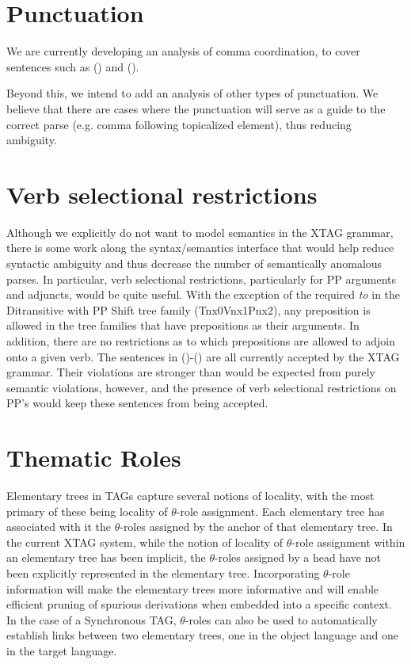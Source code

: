 \section{Punctuation}

We are currently developing an analysis of comma coordination, to
cover sentences such as () and ().


Beyond this, we intend to add an analysis of other types of punctuation. We
believe that there are cases where the punctuation will serve as a guide to the
correct parse (e.g. comma following topicalized element), thus reducing
ambiguity.


\section{Verb selectional restrictions}

Although we explicitly do not want to model semantics in the XTAG grammar,
there is some work along the syntax/semantics interface that would help reduce
syntactic ambiguity and thus decrease the number of semantically anomalous
parses.  In particular, verb selectional restrictions, particularly for PP
arguments and adjuncts, would be quite useful.  With the exception of the
required {\it to} in the Ditransitive with PP Shift tree family (Tnx0Vnx1Pnx2),
any preposition is allowed in the tree families that have prepositions as their
arguments.  In addition, there are no restrictions as to which prepositions are
allowed to adjoin onto a given verb.  The sentences in ()-() are
all currently accepted by the XTAG grammar.  Their violations are stronger than
would be expected from purely semantic violations, however, and the presence of
verb selectional restrictions on PP's would keep these sentences from being
accepted.


\section{Thematic Roles}

Elementary trees in TAGs capture several notions of locality, with the most
primary of these being locality of $\theta$-role assignment.  Each elementary
tree has associated with it the $\theta$-roles assigned by the anchor of that
elementary tree.  In the current XTAG system, while the notion of locality of
$\theta$-role assignment within an elementary tree has been implicit, the
$\theta$-roles assigned by a head have not been explicitly represented in the
elementary tree. Incorporating $\theta$-role information will make the
elementary trees more informative and will enable efficient pruning of spurious
derivations when embedded into a specific context.  In the case of a
Synchronous TAG, $\theta$-roles can also be used to automatically establish
links between two elementary trees, one in the object language and one in the
target language.


